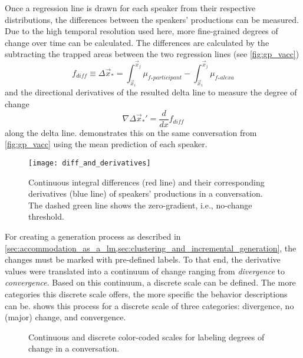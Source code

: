 Once a regression line is drawn for each speaker from their respective distributions, the differences between the speakers' productions can be measured.
Due to the high temporal resolution used here, more fine-grained degrees of change over time can be calculated.
The differences are calculated by the subtracting the trapped areas between the two regression lines (see \cref{fig:gp_vacc})
%
\begin{equation}
	f_{diff} \equiv\Delta\vec{x}_* =
	\int_{\vec{x}_i}^{\vec{x}_{j}}\mu_{f_*participant} -
	\int_{\vec{x}_i}^{\vec{x}_{j}}\mu_{f_*alexa}
\end{equation}
%
and the directional derivatives of the resulted delta line to measure the degree of change
%
\begin{equation}
	\nabla\Delta\vec{x}_*' = \frac{d}{dx}f_{diff}
\end{equation}
%
along the delta line.
 demonstrates this on the same conversation from \cref{fig:gp_vacc} using the mean prediction of each speaker.
%
\begin{figure}[t]
	\centering
	\texttt{[image: diff\_and\_derivatives]}
	\caption[Continuous integral differences and derivatives in a \acl{hci}]
		{Continuous integral differences (red line) and their corresponding derivatives (blue line) of speakers' productions in a conversation.
		The dashed green line shows the zero-gradient, i.e., no-change threshold.}
	\label{fig:diff_and_derivatives}
\end{figure}
%
For creating a generation process as described in \cref{sec:accommodation_as_a_lm,sec:clustering_and_incremental_generation}, the changes must be marked with pre-defined labels.
To that end, the derivative values were translated into a continuum of change ranging from \textit{divergence} to \textit{convergence}.
Based on this continuum, a discrete scale can be defined.
The more categories this discrete scale offers, the more specific the behavior descriptions can be.
 shows this process for a discrete scale of three categories: divergence, no (major) change, and convergence.
%
\begin{figure}[t]
	\centering
	\hfill
	\caption[Continuous and discrete scales for labeling degrees of change]
		{Continuous and discrete color-coded scales for labeling degrees of change in a conversation.}
	\label{fig:cont_disc_scales}
\end{figure}

